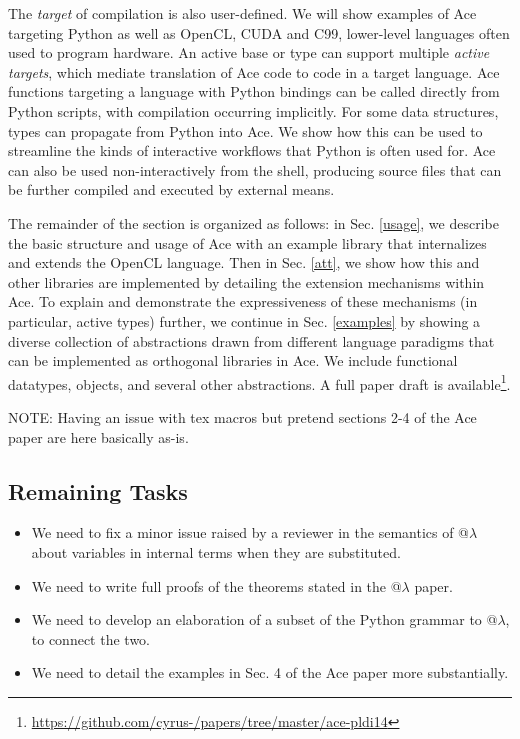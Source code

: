 The \emph{target} of compilation is also user-defined. We will show examples of Ace targeting Python as well as OpenCL, CUDA and C99, lower-level languages often used to program hardware. An active base or type can support multiple \emph{active targets}, which mediate translation of Ace code to code in a target language. Ace functions targeting a language with Python bindings can be called directly from Python scripts, with compilation occurring implicitly. For some data structures, types can propagate from Python into Ace. We show how this can be used to streamline the kinds of interactive workflows that Python is often used for. Ace can also be used non-interactively from the shell, producing source files that can be further compiled and executed by external means.

The remainder of the section is organized as follows: in Sec. \ref{usage}, we describe the basic structure and usage of Ace with an example library that internalizes and extends the OpenCL language. Then in Sec. \ref{att}, we show how this and other libraries are implemented by detailing the extension mechanisms within Ace. To explain and demonstrate the expressiveness of these mechanisms (in particular, active types) further, we continue in Sec.  \ref{examples} by showing a diverse collection of abstractions drawn from different language paradigms that can be implemented as orthogonal libraries in Ace. We include functional datatypes, objects, and several other abstractions.  A full paper draft is available\footnote{\url{https://github.com/cyrus-/papers/tree/master/ace-pldi14}}.

NOTE: Having an issue with tex macros but pretend sections 2-4 of the Ace paper are here basically as-is.

\subsection{Remaining Tasks}
\begin{itemize}
\item We need to fix a minor issue raised by a reviewer in the semantics of @$\lambda$ about variables in internal terms when they are substituted.
\item We need to write full proofs of the theorems stated in the @$\lambda$ paper.
\item We need to develop an elaboration of a subset of the Python grammar to @$\lambda$, to connect the two.
\item We need to detail the examples in Sec. 4 of the Ace paper more substantially.
\end{itemize}
